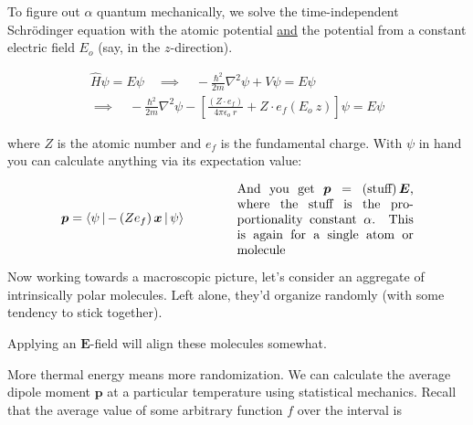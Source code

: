 \documentclass{article}
\numberwithin{equation}{section}
\begin{document}

To figure out $\alpha$ quantum mechanically, we solve the time-independent Schr{\"o}dinger equation with the atomic potential \underline{and} the potential from a constant electric field $E_o$ (say, in the $z$-direction).

\begin{gather*}
    \hat{H} \psi = E \psi \quad \implies \quad -\frac{\hbar^2}{2m} \nabla^2 \psi + V \psi = E \psi \\
    \implies \quad -\frac{\hbar^2}{2m} \nabla^2 \psi - \left[ \frac{\left( Z \cdot e_f \right)}{4\pi\epsilon_o\ r} + Z \cdot e_f \left( E_o\ z \right) \right] \psi = E \psi
\end{gather*}

where $Z$ is the atomic number and $e_f$ is the fundamental charge. With $\psi$ in hand you can calculate anything via its expectation value:

\begin{equation*}
    \bm{p} = \Braket{\psi | - \left( Z e_f \right) \bm{x} | \psi} \qquad\qquad \parbox[c]{0.4\textwidth}{And you get $\displaystyle \bm{p} = \left( \text{stuff} \right) \bm{E}$, where the stuff is the proportionality constant $\alpha$. This is again for a single atom or molecule}
\end{equation*}

Now working towards a macroscopic picture, let's consider an aggregate of intrinsically polar molecules. Left alone, they'd organize randomly (with some tendency to stick together).


Applying an $\bm{E}$-field will align these molecules somewhat.


More thermal energy means more randomization. We can calculate the average dipole moment $\bm{p}$ at a particular temperature using statistical mechanics. Recall that the average value of some arbitrary function $f$ over the interval is
\end{document}
